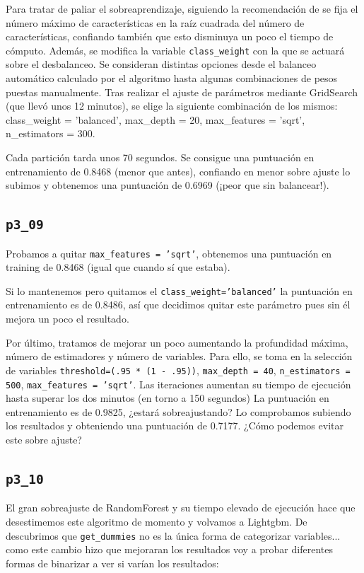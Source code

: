 \documentclass[a4paper, 20pt]{article}
\begin{document}
Para tratar de paliar el sobreaprendizaje, siguiendo la recomendación de %
se fija el número máximo de características en la raíz cuadrada del número de características, confiando también que esto disminuya un poco el tiempo de cómputo. Además, se modifica la variable \texttt{class\_weight} con la que se actuará sobre el desbalanceo. Se consideran distintas opciones desde el balanceo automático calculado por el algoritmo hasta algunas combinaciones de pesos puestas manualmente. Tras realizar el ajuste de parámetros mediante GridSearch (que llevó unos 12 minutos), se elige la siguiente combinación de los mismos: {\ttfamily class\_weight = 'balanced', max\_depth = 20, max\_features = 'sqrt', n\_estimators = 300}.

Cada partición tarda unos 70 segundos. Se consigue una puntuación en entrenamiento de 0.8468 (menor que antes), confiando en menor sobre ajuste lo subimos y obtenemos una puntuación de 0.6969 (¡peor que sin balancear!).

\subsection{\texttt{p3\_09}}
Probamos a quitar \texttt{max\_features = 'sqrt'}, obtenemos una puntuación en training de 0.8468 (igual que cuando sí que estaba).

Si lo mantenemos pero quitamos el \texttt{class\_weight='balanced'} la puntuación en entrenamiento es de 0.8486, así que decidimos quitar este parámetro pues sin él mejora un poco el resultado.

Por último, tratamos de mejorar un poco aumentando la profundidad máxima, número de estimadores y número de variables. Para ello, se toma en la selección de variables \texttt{threshold=(.95 * (1 - .95))}, \texttt{max\_depth = 40}, \texttt{n\_estimators = 500}, \texttt{max\_features = 'sqrt'}. Las iteraciones aumentan su tiempo de ejecución hasta superar los dos minutos (en torno a 150 segundos) La puntuación en entrenamiento es de 0.9825, ¿estará sobreajustando? Lo comprobamos subiendo los resultados y obteniendo una puntuación de 0.7177. ¿Cómo podemos evitar este sobre ajuste?

\subsection{\texttt{p3\_10}}

El gran sobreajuste de RandomForest y su tiempo elevado de ejecución hace que desestimemos este algoritmo de momento y volvamos a Lightgbm.
De %
descubrimos que \texttt{get\_dummies} no es la única forma de categorizar variables... como este cambio hizo que mejoraran los resultados voy a probar diferentes formas de binarizar a ver si varían los resultados:
\end{document}
